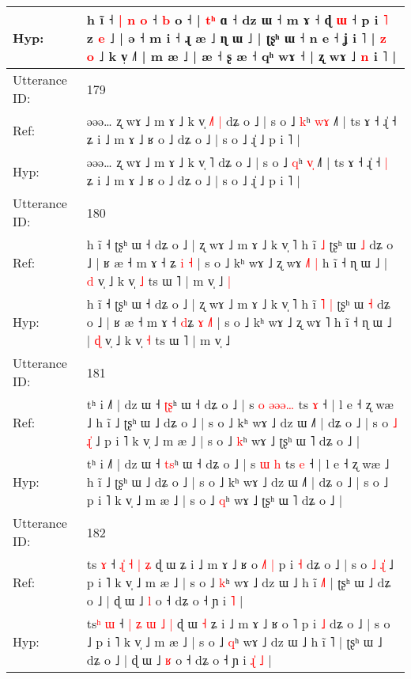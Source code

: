 \documentclass[10pt]{article}
\DeclareRobustCommand{\hl}[1]{{\textcolor{red}{#1}}}
\begin{document}
\begin{longtable}{ll}
 \\
Hyp: & h ĩ ˧\hl{ }\hl{|} \hl{n} \hl{o} ˧ \hl{b} o ˧\hl{} | \hl{t}\hl{ʰ} ɑ ˧ dz ɯ ˧ m ɤ ˧ ɖ \hl{ɯ} ˧\hl{}\hl{} p i \hl{˥} z \hl{e} ˩ | ə ˧ m i ˧ ɻ æ ˩ ɳ ɯ ˩ | ʈʂʰ ɯ ˧ n e ˧ ʝ i ˥ | \hl{z} \hl{}\hl{o} ˩ k v̩ ˩˥ | m æ ˩ | æ ˧ ʂ æ ˧ qʰ wɤ ˧\hl{} | ʐ wɤ ˩ \hl{n} i ˥ |
 \\
\midrule
Utterance ID: & 179 \\
Ref: & əəə… ʐ wɤ ˩ m ɤ ˩ k v̩ \hl{˩}˥\hl{ }\hl{|} dʑ o ˩ | s o ˩ \hl{k}ʰ \hl{w}\hl{ɤ} ˩˥ | ts ɤ ˧ ɻ̍ ˧\hl{}\hl{} ʑ i ˩ m ɤ ˩ ʁ o ˩ dʑ o ˩ | s o ˩ ɻ̍ ˩ p i ˥ |
 \\
Hyp: & əəə… ʐ wɤ ˩ m ɤ ˩ k v̩ \hl{}˥\hl{}\hl{} dʑ o ˩ | s o ˩ \hl{q}ʰ \hl{v}\hl{̩} ˩˥ | ts ɤ ˧ ɻ̍ ˧\hl{ }\hl{|} ʑ i ˩ m ɤ ˩ ʁ o ˩ dʑ o ˩ | s o ˩ ɻ̍ ˩ p i ˥ |
 \\
\midrule
Utterance ID: & 180 \\
Ref: & h ĩ ˧ ʈʂʰ ɯ ˧ dʑ o ˩ | ʐ wɤ ˩ m ɤ ˩ k v̩ ˥ h ĩ\hl{}\hl{} \hl{˩} ʈʂʰ ɯ \hl{˩} dʑ o ˩ | ʁ æ ˧ m ɤ ˧ \hl{}ʑ \hl{i} \hl{}\hl{˧} | s o ˩ kʰ wɤ ˩ ʐ wɤ \hl{˩}˥\hl{ }\hl{|} h ĩ ˧ ɳ ɯ ˩ | \hl{d} v̩ ˩ k v̩ \hl{˩} ts ɯ ˥ | m v̩ ˩\hl{ }\hl{|}
 \\
Hyp: & h ĩ ˧ ʈʂʰ ɯ ˧ dʑ o ˩ | ʐ wɤ ˩ m ɤ ˩ k v̩ ˥ h ĩ\hl{ }\hl{˥} \hl{|} ʈʂʰ ɯ \hl{˧} dʑ o ˩ | ʁ æ ˧ m ɤ ˧ \hl{d}ʑ \hl{ɤ} \hl{˩}\hl{˥} | s o ˩ kʰ wɤ ˩ ʐ wɤ \hl{}˥\hl{}\hl{} h ĩ ˧ ɳ ɯ ˩ | \hl{ɖ} v̩ ˩ k v̩ \hl{˧} ts ɯ ˥ | m v̩ ˩\hl{}\hl{}
 \\
\midrule
Utterance ID: & 181 \\
Ref: & tʰ i ˩˥ | dz ɯ ˧ \hl{ʈ}\hl{ʂ}ʰ ɯ ˧ dʑ o ˩ | s \hl{o} \hl{ə}\hl{ə}\hl{ə}\hl{…} ts \hl{ɤ} ˧ | l e ˧ ʐ wæ ˩ h ĩ ˩ ʈʂʰ ɯ ˩ dʑ o ˩ | s o ˩ kʰ wɤ ˩ dz ɯ ˩˥ | dʑ o ˩ | s o\hl{ }\hl{˩}\hl{ }\hl{ɻ}\hl{̍} ˩ p i ˥ k v̩ ˩ m æ ˩ | s o ˩ \hl{k}ʰ wɤ ˩ ʈʂʰ ɯ ˥ dʑ o ˩ |
 \\
Hyp: & tʰ i ˩˥ | dz ɯ ˧ \hl{t}\hl{s}ʰ ɯ ˧ dʑ o ˩ | s \hl{ɯ} \hl{}\hl{}\hl{}\hl{h} ts \hl{e} ˧ | l e ˧ ʐ wæ ˩ h ĩ ˩ ʈʂʰ ɯ ˩ dʑ o ˩ | s o ˩ kʰ wɤ ˩ dz ɯ ˩˥ | dʑ o ˩ | s o\hl{}\hl{}\hl{}\hl{}\hl{} ˩ p i ˥ k v̩ ˩ m æ ˩ | s o ˩ \hl{q}ʰ wɤ ˩ ʈʂʰ ɯ ˥ dʑ o ˩ |
 \\
\midrule
Utterance ID: & 182 \\
Ref: & ts\hl{} \hl{ɤ} ˧ \hl{}\hl{ɻ}\hl{̍} \hl{˧} \hl{|} \hl{ʑ} ɖ ɯ\hl{}\hl{} ʑ i ˩ m ɤ ˩ ʁ o \hl{˩}˥\hl{ }\hl{|} p i \hl{˧} dʑ o ˩ | s o\hl{ }\hl{˩}\hl{ }\hl{ɻ}\hl{̍} ˩ p i ˥ k v̩ ˩ m æ ˩ | s o ˩ \hl{k}ʰ wɤ ˩ dz ɯ ˩ h ĩ \hl{˩}˥ | ʈʂʰ ɯ ˩ dʑ o ˩ | ɖ ɯ ˩ \hl{l} o ˧ dʑ o ˧ ɲ i\hl{}\hl{}\hl{} \hl{˥} |
 \\
Hyp: & ts\hl{ʰ} \hl{ɯ} ˧ \hl{|}\hl{ }\hl{ʑ} \hl{ɯ} \hl{˩} \hl{|} ɖ ɯ\hl{ }\hl{˧} ʑ i ˩ m ɤ ˩ ʁ o \hl{}˥\hl{}\hl{} p i \hl{˩} dʑ o ˩ | s o\hl{}\hl{}\hl{}\hl{}\hl{} ˩ p i ˥ k v̩ ˩ m æ ˩ | s o ˩ \hl{q}ʰ wɤ ˩ dz ɯ ˩ h ĩ \hl{}˥ | ʈʂʰ ɯ ˩ dʑ o ˩ | ɖ ɯ ˩ \hl{ʁ} o ˧ dʑ o ˧ ɲ i\hl{ }\hl{ɻ}\hl{̍} \hl{˩} |

\end{longtable}
\end{document}

